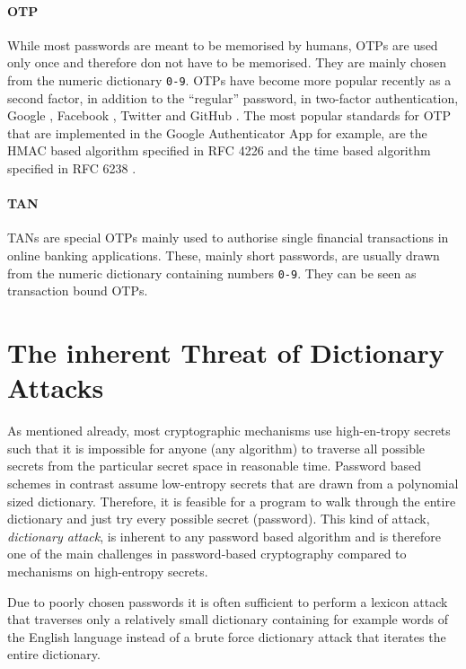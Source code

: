 \paragraph{\acl{OTP}}
While most passwords are meant to be memorised by humans, \acp{OTP} are used only once and therefore don not have to be memorised.
They are mainly chosen from the numeric dictionary \texttt{0-9}.
\acp{OTP} have become more popular recently as a second factor, in addition to the ``regular'' password, in two-factor authentication, \eg Google \cite{Google2Factor}, Facebook \cite{FB2Factor}, Twitter \cite{Twitter2Factor} and GitHub \cite{Github2Factor}.
The most popular standards for \ac{OTP} that are implemented in the Google Authenticator App \cite{GAuthenticator} for example, are the \acs{HMAC} based algorithm specified in RFC 4226 \cite{rfc4226} and the time based algorithm specified in RFC 6238 \cite{rfc6238}.

\paragraph{\acl{TAN}}
\acp{TAN} are special \acp{OTP} mainly used to authorise single financial transactions in online banking applications.
These, mainly short passwords, are usually drawn from the numeric dictionary containing numbers \texttt{0-9}.
They can be seen as transaction bound \acp{OTP}.

\section{The inherent Threat of Dictionary Attacks}\label{sec:introdictionaryattacks}
As mentioned already, most cryptographic mechanisms use high-en-tropy secrets such that it is impossible for anyone (any algorithm) to traverse all possible secrets from the particular secret space in reasonable time.
Password based schemes in contrast assume low-entropy secrets that are drawn from a polynomial sized dictionary.
Therefore, it is feasible for a program to walk through the entire dictionary and just try every possible secret (password).
This kind of attack, \emph{dictionary attack}, is inherent to any password based algorithm and is therefore one of the main challenges in password-based cryptography compared to mechanisms on high-entropy secrets.

Due to poorly chosen passwords it is often sufficient to perform a lexicon attack that traverses only a relatively small dictionary containing for example words of the English language instead of a brute force dictionary attack that iterates the entire dictionary.

